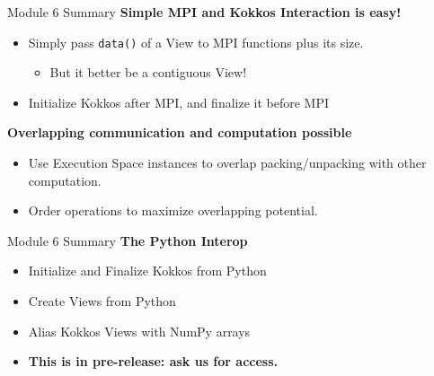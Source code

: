 



\begin{frame}{Module 6 Summary}
\textbf{Simple MPI and Kokkos Interaction is easy!}
\begin{itemize}
  \item Simply pass \texttt{data()} of a View to MPI functions plus its size.
  \begin{itemize}
    \item But it better be a contiguous View!
  \end{itemize}
  \item Initialize Kokkos after MPI, and finalize it before MPI
\end{itemize}

\vspace{10pt}
\textbf{Overlapping communication and computation possible}
\begin{itemize}
  \item Use Execution Space instances to overlap packing/unpacking with other computation.
  \item Order operations to maximize overlapping potential. 
\end{itemize}
\end{frame}

\begin{frame}[fragile]{Module 6 Summary}
  \textbf{The Python Interop}
  \begin{itemize}
    \item Initialize and Finalize Kokkos from Python
    \item Create Views from Python
    \item Alias Kokkos Views with NumPy arrays
    \item \textbf{This is in pre-release: ask us for access.}
  \end{itemize}
\end{frame}

